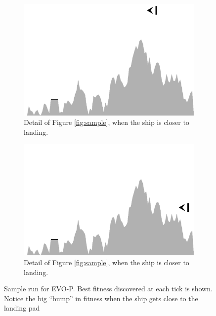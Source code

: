 \documentclass[conference]{IEEEtran}
\begin{document}
\begin{figure}[ht]
\begin{subfigure}{0.49\textwidth}
        \end{subfigure}
\\
        \begin{subfigure}{0.49\textwidth}
                \centering
                \includegraphics[width=1.0\textwidth]{./graphics/map1-tall.pdf}
                \caption{Detail of Figure \ref{fig:sample}, when the ship is closer to landing.}
                \label{fig:map1-tall}\end{subfigure}\begin{subfigure}{0.49\textwidth}
                \centering
                \includegraphics[width=1.0\textwidth]{./graphics/map1-wall.pdf}
                \caption{Detail of Figure \ref{fig:sample}, when the ship is closer to landing.}
                \label{fig:map-wall}

        \end{subfigure}
       

         \caption{Sample run for EVO-P. Best fitness discovered at each tick is shown. Notice the big ``bump'' in fitness when the ship gets close to the landing pad}
         \label{fig:maps}

\end{figure}
\end{document}
